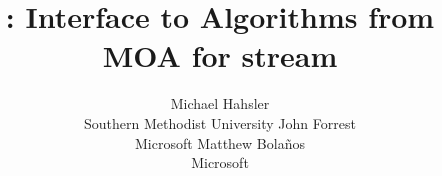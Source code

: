 \documentclass[nojss]{jss}
\author{
Michael Hahsler\\Southern Methodist University
\And
John Forrest\\Microsoft
\AND
Matthew Bola\~nos\\Microsoft
}
\title{\pkg{streamMOA}: Interface to Algorithms from MOA for stream}
\begin{document}
\vfill
\end{document}
